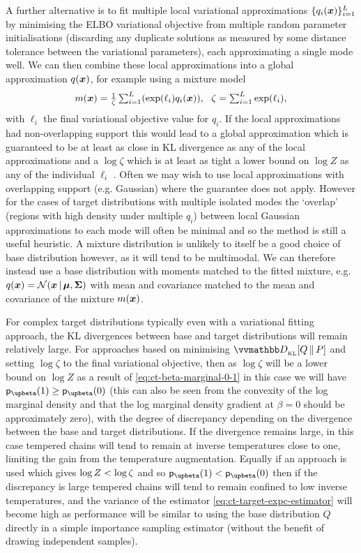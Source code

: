 A further alternative is to fit multiple local variational approximations $\lbrace q_i(\boldsymbol{x}) \rbrace_{i=1}^L$ by minimising the \ac{ELBO} variational objective from multiple random parameter initialisations (discarding any duplicate solutions as measured by some distance tolerance between the variational parameters), each approximating a single mode well. We can then combine these local approximations into a global approximation $q(\boldsymbol{x})$, for example using a mixture model
\begin{equation}\label{eq:variational-mixture-approx}\textstyle
  m(\vct{x}) = \frac{1}{\zeta} \sum_{i=1}^L \lpa \exp(\ell_i) q_i(\vct{x}) \rpa,~~
  \zeta = \sum_{i=1}^L \exp(\ell_i),
\end{equation}
with $\ell_i$ the final variational objective value for $q_i$. If the local approximations had non-overlapping support this would lead to a global approximation which is guaranteed to be at least as close in \ac{KL} divergence as any of the local approximations and a $\log \zeta$ which is at least as tight a lower bound on $\log Z$ as any of the individual $\ell_i$ \citep{zobay2009mean}. Often we may wish to use local approximations with overlapping support (e.g. Gaussian) where the guarantee does not apply. However for the cases of target distributions with multiple isolated modes the `overlap' (regions with high density under multiple $q_i$) between local Gaussian approximations to each mode will often be minimal and so the method is still a useful heuristic. A mixture distribution is unlikely to itself be a good choice of base distribution however, as it will tend to be multimodal. We can therefore instead use a base distribution with moments matched to the fitted mixture, e.g. $q(\vct{x}) = \nrm{\vct{x}\gvn\vct{\mu},\mtx{\Sigma}}$ with mean and covariance matched to the mean and covariance of the mixture $m(\boldsymbol{x})$.

For complex target distributions typically even with a variational fitting approach, the \ac{KL} divergences between base and target distributions will remain relatively large. For approaches based on minimising $\kldiv{Q}{P}$ and setting $\log \zeta$ to the final variational objective, then as $\log \zeta$ will be a lower bound on $\log Z$ as a result of \eqref{eq:ct-beta-marginal-0-1} in this case we will have $\pden{\upbeta}(1) \geq \pden{\upbeta}(0)$ (this can also be seen from the convexity of the log marginal density and that the log marginal density gradient at $\beta=0$ should be approximately zero), with the degree of discrepancy depending on the divergence between the base and target distributions. If the divergence remains large, in this case tempered chains will tend to remain at inverse temperatures close to one, limiting the gain from the temperature augmentation. Equally if an approach is used which gives $\log Z <  \log\zeta$ and so $\pden{\upbeta}(1) < \pden{\upbeta}(0)$ then if the discrepancy is large tempered chains will tend to remain confined to low inverse temperatures, and the variance of the estimator \eqref{eq:ct-target-expc-estimator} will become high as performance will be similar to using the base distribution $Q$ directly in a simple importance sampling estimator (without the benefit of drawing independent samples).


